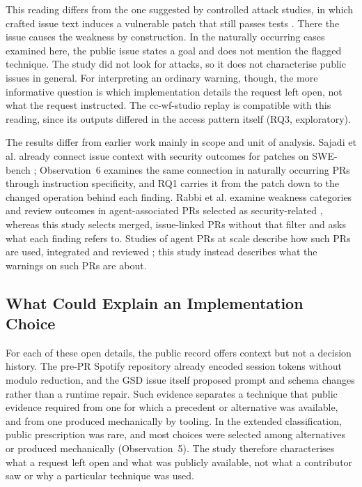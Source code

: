 \documentclass[acmsmall,screen,nonacm,review]{acmart}
\begin{document}
This reading differs from the one suggested by controlled attack studies, in which crafted issue text induces a vulnerable patch that still passes tests \cite{b3,b16}. There the issue causes the weakness by construction. In the naturally occurring cases examined here, the public issue states a goal and does not mention the flagged technique. The study did not look for attacks, so it does not characterise public issues in general. For interpreting an ordinary warning, though, the more informative question is which implementation details the request left open, not what the request instructed. The cc-wf-studio replay is compatible with this reading, since its outputs differed in the access pattern itself (RQ3, exploratory).

The results differ from earlier work mainly in scope and unit of analysis. Sajadi et al. already connect issue context with security outcomes for patches on SWE-bench \cite{b48}; Observation~6 examines the same connection in naturally occurring PRs through instruction specificity, and RQ1 carries it from the patch down to the changed operation behind each finding. Rabbi et al. examine weakness categories and review outcomes in agent-associated PRs selected as security-related \cite{b49}, whereas this study selects merged, issue-linked PRs without that filter and asks what each finding refers to. Studies of agent PRs at scale describe how such PRs are used, integrated and reviewed \cite{b11,b21}; this study instead describes what the warnings on such PRs are about.

\subsection{What Could Explain an Implementation Choice}\label{sec:explain}

For each of these open details, the public record offers context but not a decision history. The pre-PR Spotify repository already encoded session tokens without modulo reduction, and the GSD issue itself proposed prompt and schema changes rather than a runtime repair. Such evidence separates a technique that public evidence required from one for which a precedent or alternative was available, and from one produced mechanically by tooling. In the extended classification, public prescription was rare, and most choices were selected among alternatives or produced mechanically (Observation~5). The study therefore characterises what a request left open and what was publicly available, not what a contributor saw or why a particular technique was used.
\end{document}
